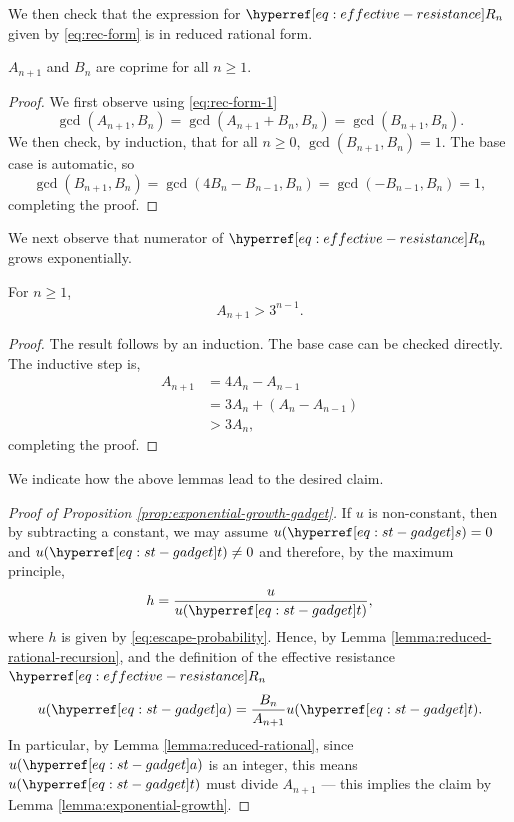 \documentclass[12pt]{amsart}
\numberwithin{equation}{section}
\begin{document}
	We then check that the expression for $\Rn{n}$ given by \eqref{eq:rec-form} is in reduced rational form. 
	\begin{lemma} \label{lemma:reduced-rational}
		$A_{n+1}$ and $B_{n}$ are coprime for all $n \geq 1$. 
	\end{lemma}
	\begin{proof}
		We first observe using \eqref{eq:rec-form-1}
		\[
		\gcd(A_{n+1}, B_n) = \gcd(A_{n+1} +  B_n, B_n) = \gcd(B_{n+1}, B_n).
		\]
		We then check, by induction, that for all $n \geq 0$, $ \gcd(B_{n+1}, B_n) = 1$. The base case is automatic, so
		\[
		\gcd(B_{n+1}, B_n) = \gcd( 4 B_{n} - B_{n-1}, B_n)  = \gcd(-B_{n-1}, B_n) = 1,
		\]
		completing the proof.
	\end{proof}
	We next observe that numerator of $\Rn{n}$ grows exponentially.
	\begin{lemma} \label{lemma:exponential-growth}
		For $n \geq 1$, 
		\[
		A_{n+1} > 3^{n-1}.
		\]
	\end{lemma}
	\begin{proof}
		The result follows by an induction. The base case can be checked directly. The inductive step is, 
		\begin{align*}
			A_{n+1} &= 4 A_{n} - A_{n-1} \\
			&= 3 A_n + (A_n - A_{n-1}) \\
			&> 3 A_n,
		\end{align*}
		completing the proof. 
	\end{proof}
	
	We indicate how the above lemmas lead to the desired claim. 
	\begin{proof}[Proof of Proposition \ref{prop:exponential-growth-gadget}]
		If $u$ is non-constant, then by subtracting a constant, we may assume $u(\sgadget) = 0$ and $u(\tgadget) \neq 0$ and therefore, by the maximum principle, 
		\[
		h =  \frac{u}{u(\tgadget)},
		\]
		where $h$ is given by \eqref{eq:escape-probability}. Hence, by Lemma \ref{lemma:reduced-rational-recursion},
		and the definition of the effective resistance $\Rn{n}$
		\[
		u(\agadget) =  \frac{B_n}{A_{n+1}} u(\tgadget).
		\]
		In particular, by Lemma \ref{lemma:reduced-rational},  since $u(\agadget)$ is an integer, this means $u(\tgadget)$ must divide $A_{n+1}$ --- this implies the claim by Lemma \ref{lemma:exponential-growth}.
	\end{proof}
	
	
	
\end{document}
